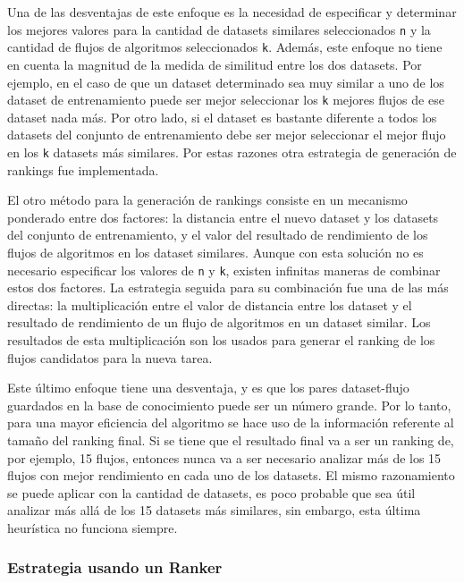 Una de las desventajas de este enfoque es la necesidad de especificar y determinar los mejores valores para la cantidad de datasets similares seleccionados \texttt{n} y la cantidad de flujos de algoritmos seleccionados \texttt{k}. Además, este enfoque no tiene en cuenta la magnitud de la medida de similitud entre los dos datasets. Por ejemplo, en el caso de que un dataset determinado sea muy similar a uno de los dataset de entrenamiento puede ser mejor seleccionar los \texttt{k} mejores flujos de ese dataset nada más. Por otro lado, si el dataset es bastante diferente a todos los datasets del conjunto de entrenamiento debe ser mejor seleccionar el mejor flujo en los \texttt{k} datasets más similares. Por estas razones otra estrategia de generación de rankings fue implementada. 

El otro método para la generación de rankings consiste en un mecanismo ponderado entre dos factores: la distancia entre el nuevo dataset y los datasets del conjunto de entrenamiento, y el valor del resultado de rendimiento de los flujos de algoritmos en los dataset similares. Aunque con esta solución no es necesario especificar los valores de \texttt{n} y \texttt{k}, existen infinitas maneras de combinar estos dos factores. La estrategia seguida para su combinación fue una de las más directas: la multiplicación entre el valor de distancia entre los dataset y el resultado de rendimiento de un flujo de algoritmos en un dataset similar. Los resultados de esta multiplicación son los usados para generar el ranking de los flujos candidatos para la nueva tarea.

Este último enfoque tiene una desventaja, y es que los pares dataset-flujo guardados en la base de conocimiento puede ser un número grande. Por lo tanto, para una mayor eficiencia del algoritmo se hace uso de la información referente al tamaño del ranking final. Si se tiene que el resultado final va a ser un ranking de, por ejemplo, 15 flujos, entonces nunca va a ser necesario analizar más de los 15 flujos con mejor rendimiento en cada uno de los datasets. El mismo razonamiento se puede aplicar con la cantidad de datasets, es poco probable que sea útil analizar más allá de los 15 datasets más similares, sin embargo, esta última heurística no funciona siempre. 

\subsubsection{Estrategia usando un Ranker}

